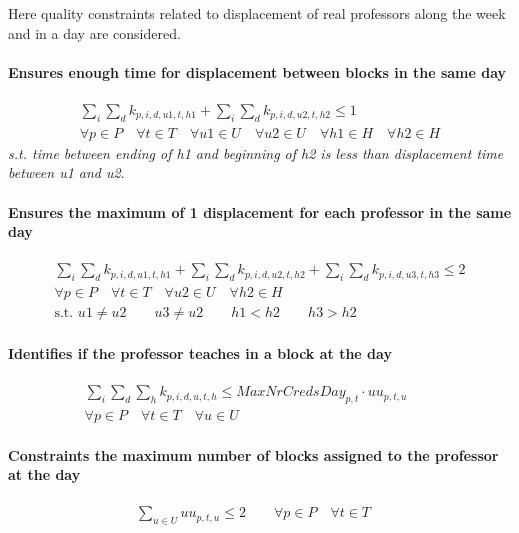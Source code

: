 Here quality constraints related to displacement of real professors along the week and in a day are considered.


\paragraph{Ensures enough time for displacement between blocks in the same day}
\begin{eqnarray}
\sum\limits_{i} \sum\limits_{d} k_{p,i,d,u1,t,h1} + \sum\limits_{i} \sum\limits_{d} k_{p,i,d,u2,t,h2} \le 1 \nonumber
\\
\forall p \in P \quad
\forall t \in T \quad
\forall u1 \in U \quad
\forall u2 \in U \quad
\forall h1 \in H \quad
\forall h2 \in H \nonumber
\end{eqnarray}	
\textit{s.t. time between ending of h1 and beginning of h2 is less than displacement time between u1 and u2}.

\paragraph{Ensures the maximum of 1 displacement for each professor in the same day}
\begin{eqnarray}
\sum\limits_{i} \sum\limits_{d} k_{p,i,d,u1,t,h1} + \sum\limits_{i} \sum\limits_{d} k_{p,i,d,u2,t,h2} + \sum\limits_{i} \sum\limits_{d} k_{p,i,d,u3,t,h3} \le 2 \nonumber
\\
\forall p \in P \quad
\forall t \in T \quad
\forall u2 \in U \quad
\forall h2 \in H \nonumber
\\
\mbox{s.t. }u1 \neq u2 \qquad u3 \neq u2 \qquad h1<h2 \qquad h3>h2 \nonumber
\end{eqnarray}

\paragraph{Identifies if the professor teaches in a block at the day}
\begin{eqnarray}
\sum\limits_{i} \sum\limits_{d} \sum\limits_{h} k_{p,i,d,u,t,h} \le MaxNrCredsDay_{p,t} \cdot uu_{p,t,u} \nonumber \qquad
\\
\forall p \in P \quad
\forall t \in T \quad
\forall u \in U \quad \nonumber
\end{eqnarray}

\paragraph{Constraints the maximum number of blocks assigned to the professor at the day}
\begin{eqnarray}
\sum\limits_{u \in U} uu_{p,t,u} \le 2 \nonumber \qquad
\forall p \in P \quad
\forall t \in T \quad \nonumber
\end{eqnarray}


